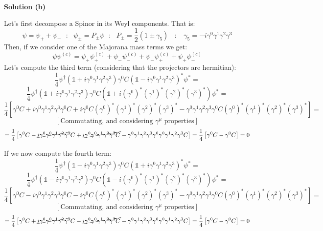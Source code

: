 \documentclass[12pt]{article}
\begin{document}
\color{blue}

\textbf{Solution (b)}

Let's first decompose a Spinor in its Weyl components. That is:
\[
    \psi = \psi_+ + \psi_- ~~~:~~~ \psi_\pm = P_\pm \psi ~~~:~~~ P_\pm = \frac{1}{2}(1\pm\gamma_5) ~~~~:~~~~ \gamma_5 = -i\gamma^0\gamma^1\gamma^2\gamma^3
\]
Then, if we consider one of the Majorana mass terms we get:
\[
    \overline{\psi}\psi^{(c)} = \overline{\psi}_+\psi^{(c)}_+ + \overline{\psi}_-\psi^{(c)}_- + \overline{\psi}_-\psi^{(c)}_+ +\overline{\psi}_+\psi^{(c)}_-
\]
Let's compute the third term (considering that the projectors are hermitian):
\[
    \frac{1}{4}\psi^\dagger(\mathbb{1}+i\gamma^0\gamma^1\gamma^2\gamma^3)\gamma^0C(\mathbb{1}-i\gamma^0\gamma^1\gamma^2\gamma^3)^* \psi^* = 
\]
\[
    \frac{1}{4}\psi^\dagger(\mathbb{1}+i\gamma^0\gamma^1\gamma^2\gamma^3)\gamma^0C(\mathbb{1}+i(\gamma^0)^*(\gamma^1)^*(\gamma^2)^*(\gamma^3)^*) \psi^* =
\]
\[
    \frac{1}{4}\left[\gamma^0C+i\gamma^0\gamma^1\gamma^2\gamma^3\gamma^0C+i\gamma^0C(\gamma^0)^*(\gamma^1)^*(\gamma^2)^*(\gamma^3)^*-\gamma^0\gamma^1\gamma^2\gamma^3\gamma^0C(\gamma^0)^*(\gamma^1)^*(\gamma^2)^*(\gamma^3)^*\right] = 
\]
\[
    \left[\text{Commutating, and considering $\gamma^\mu$ properties}\right]
\]
\[
    = \frac{1}{4}\left[\gamma^0C-\cancel{i\gamma^0\gamma^0\gamma^1\gamma^2\gamma^3}C+\cancel{i\gamma^0\gamma^0\gamma^1\gamma^2\gamma^3C}-\gamma^0\gamma^1\gamma^2\gamma^3\gamma^0\gamma^0\gamma^1\gamma^2\gamma^3C\right]
    = \frac{1}{4}\left[\gamma^0C -\gamma^0C\right] = 0
\]

If we now compute the fourth term:
\[
    \frac{1}{4}\psi^\dagger(\mathbb{1}-i\gamma^0\gamma^1\gamma^2\gamma^3)\gamma^0C(\mathbb{1}+i\gamma^0\gamma^1\gamma^2\gamma^3)^* \psi^* = 
\]
\[
    \frac{1}{4}\psi^\dagger(\mathbb{1}-i\gamma^0\gamma^1\gamma^2\gamma^3)\gamma^0C(\mathbb{1}-i(\gamma^0)^*(\gamma^1)^*(\gamma^2)^*(\gamma^3)^*) \psi^* =
\]
\[
    \frac{1}{4}\left[\gamma^0C-i\gamma^0\gamma^1\gamma^2\gamma^3\gamma^0C-i\gamma^0C(\gamma^0)^*(\gamma^1)^*(\gamma^2)^*(\gamma^3)^*-\gamma^0\gamma^1\gamma^2\gamma^3\gamma^0C(\gamma^0)^*(\gamma^1)^*(\gamma^2)^*(\gamma^3)^*\right] = 
\]
\[
    \left[\text{Commutating, and considering $\gamma^\mu$ properties}\right]
\]
\[
    = \frac{1}{4}\left[\gamma^0C+\cancel{i\gamma^0\gamma^0\gamma^1\gamma^2\gamma^3}C-\cancel{i\gamma^0\gamma^0\gamma^1\gamma^2\gamma^3C}-\gamma^0\gamma^1\gamma^2\gamma^3\gamma^0\gamma^0\gamma^1\gamma^2\gamma^3C\right]
    = \frac{1}{4}\left[\gamma^0C -\gamma^0C\right] = 0
\]
\end{document}
